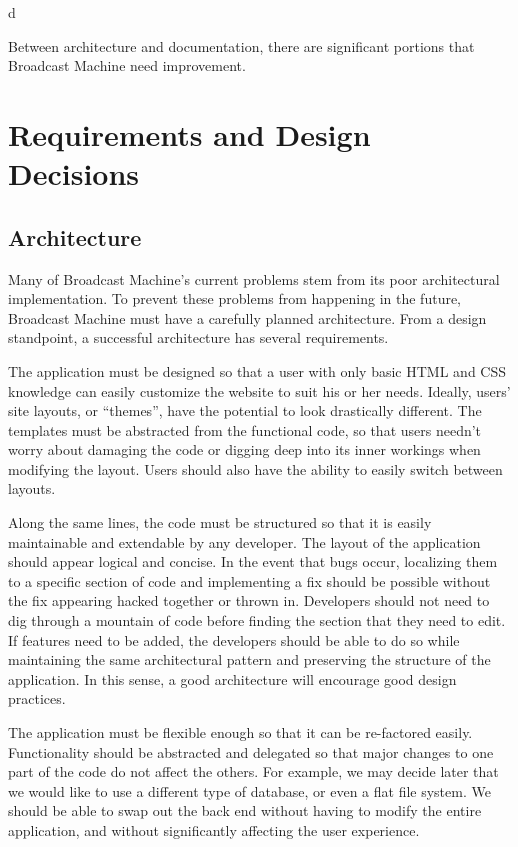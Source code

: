 d\documentclass[a4paper,12pt]{report}
\begin{document}
{{Between architecture and documentation, there are significant portions that Broadcast Machine need improvement.


\chapter{Requirements and Design Decisions}

\section{Architecture}

	Many of Broadcast Machine’s current problems stem from its poor architectural implementation. 
To prevent these problems from happening in the future, Broadcast Machine must have a carefully planned architecture. 
From a design standpoint, a successful architecture has several requirements.

The application must be designed so that a user with only basic HTML and CSS knowledge can easily customize the website to suit his or her needs. 
Ideally, users’ site layouts, or “themes”, have the potential to look drastically different. 
The templates must be abstracted from the functional code, so that users needn’t worry about damaging the code or digging deep into its inner workings when modifying the layout. 
Users should also have the ability to easily switch between layouts.

Along the same lines, the code must be structured so that it is easily maintainable and extendable by any developer. 
The layout of the application should appear logical and concise. 
In the event that bugs occur, localizing them to a specific section of code and implementing a fix should be possible without the fix appearing hacked together or thrown in. 
Developers should not need to dig through a mountain of code before finding the section that they need to edit. 
If features need to be added, the developers should be able to do so while maintaining the same architectural pattern and preserving the structure of the application. 
In this sense, a good architecture will encourage good design practices.

The application must be flexible enough so that it can be re-factored easily. Functionality should be abstracted and delegated so that major changes to one part of the code do not affect the others. 
For example, we may decide later that we would like to use a different type of database, or even a flat file system. We should be able to swap out the back end without having to modify the entire application, and without significantly affecting the user experience.

}}
\end{document}
